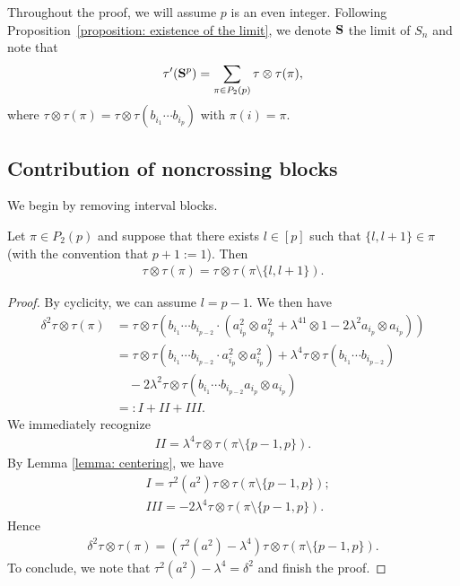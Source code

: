 \documentclass[12pt,reqno]{amsart}
\theoremstyle{plain}
\newcommand{\1}{\mathbf{1}}
\begin{document}
Throughout the proof, we will assume $p$ is an even integer. Following Proposition~\ref{proposition: existence of the limit}, we denote ${\bf{S}}$ the limit of $S_n$ and note that 
\begin{align*}
    \tau'({\bf{S}}^{p})=\sum_{\pi \in P_2(p)}\tau\otimes \tau(\pi),
\end{align*}
where $\tau\otimes \tau(\pi)=\tau\otimes \tau(b_{i_1}\cdots b_{i_p})$ with $\pi(i)=\pi$. 

\subsection{Contribution of noncrossing blocks}


We begin by removing interval blocks.
\begin{lemma}\label{lemma: interval blocks}
    Let $\pi \in P_2(p)$ and suppose that there exists $l \in [p]$ such that $\{l,l+1\} \in \pi$ (with the convention that $p+1:=1$). Then
    \begin{align*}
        \tau \otimes \tau (\pi)=\tau\otimes \tau(\pi\setminus \{l,l+1\}).
    \end{align*}
\end{lemma}
\begin{proof}
    By cyclicity, we can assume $l=p-1$. We then have
    \begin{align*}
       \delta^2 \tau\otimes \tau(\pi)&=\tau\otimes \tau\left(b_{i_1}\cdots b_{i_{p-2}}\cdot \left(a_{i_p}^2\otimes a_{i_p}^2+\lambda^41\otimes 1-2\lambda^2a_{i_p}\otimes a_{i_p}\right)\right)\\
        &=\tau\otimes \tau\left(b_{i_1}\cdots b_{i_{p-2}}\cdot a_{i_p}^2\otimes a_{i_p}^2\right)+\lambda^4\tau\otimes \tau\left(b_{i_1}\cdots b_{i_{p-2}}\right)\\
        &\quad -2\lambda^2\tau\otimes \tau\left(b_{i_1}\cdots b_{i_{p-2}}a_{i_p}\otimes a_{i_p}\right)\\
        &=:I+II+III.
    \end{align*}
    We immediately recognize
    \begin{align*}
        II=\lambda^4\tau\otimes \tau(\pi\setminus \{p-1,p\}).
    \end{align*}
    By Lemma \ref{lemma: centering}, we have
    \begin{align*}
        &I=\tau^2(a^2)\tau\otimes \tau(\pi\setminus \{p-1,p\});\\
        &III=-2\lambda^4\tau\otimes \tau(\pi\setminus \{p-1,p\}).
    \end{align*}
    Hence
    \begin{align*}
        \delta^2\tau\otimes \tau(\pi)=\left(\tau^2(a^2)-\lambda^4\right)\tau\otimes \tau(\pi\setminus \{p-1,p\}).
    \end{align*}
    To conclude, we note that $\tau^2(a^2)-\lambda^4=\delta^2$ and finish the proof. 
\end{proof}
\end{document}

